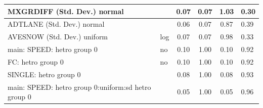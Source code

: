 \begin{table}
\begin{center}
\begin{tabular}{|l|l|c|c|c|l|}
			\hline
			MXGRDIFF (Std. Dev.) normal &  & 0.07 & 0.07 & 1.03 & 0.30 \\
			\hline
			ADTLANE (Std. Dev.) normal &  & 0.06 & 0.07 & 0.87 & 0.39 \\
			\hline
			AVESNOW (Std. Dev.) uniform & log & 0.07 & 0.07 & 0.98 & 0.33 \\
			\hline
			main: SPEED: hetro group 0 & no & 0.10 & 1.00 & 0.10 & 0.92 \\
			\hline
			FC: hetro group 0 & no & 0.10 & 1.00 & 0.10 & 0.92 \\
			\hline
			SINGLE: hetro group 0 &  & 0.08 & 1.00 & 0.08 & 0.93 \\
			\hline
			main: SPEED: hetro group 0:uniform:sd  hetro group 0 &  & 0.05 & 1.00 & 0.05 & 0.96 \\
			\hline
		\end{tabular}
	\end{center}
\end{table}